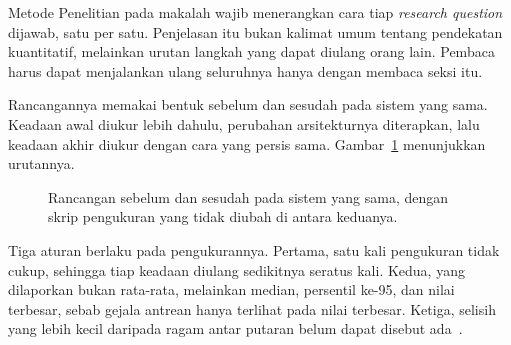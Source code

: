 Metode Penelitian pada makalah wajib menerangkan cara tiap \textit{research
question} dijawab, satu per satu. Penjelasan itu bukan kalimat umum tentang
pendekatan kuantitatif, melainkan urutan langkah yang dapat diulang orang
lain. Pembaca harus dapat menjalankan ulang seluruhnya hanya dengan membaca
seksi itu.

Rancangannya memakai bentuk sebelum dan sesudah pada sistem yang sama.
Keadaan awal diukur lebih dahulu, perubahan arsitekturnya diterapkan, lalu
keadaan akhir diukur dengan cara yang persis sama.
Gambar~\ref{fig:rancangan-ukur} menunjukkan urutannya.

\begin{figure}[htbp]
  \centering
  \caption{Rancangan sebelum dan sesudah pada sistem yang sama, dengan skrip
    pengukuran yang tidak diubah di antara keduanya.}
  \label{fig:rancangan-ukur}
\end{figure}

Tiga aturan berlaku pada pengukurannya. Pertama, satu kali pengukuran tidak
cukup, sehingga tiap keadaan diulang sedikitnya seratus kali. Kedua, yang
dilaporkan bukan rata-rata, melainkan median, persentil ke-95, dan nilai
terbesar, sebab gejala antrean hanya terlihat pada nilai terbesar. Ketiga,
selisih yang lebih kecil daripada ragam antar putaran belum dapat disebut
ada~\cite{wohlin2012experimentation}.

